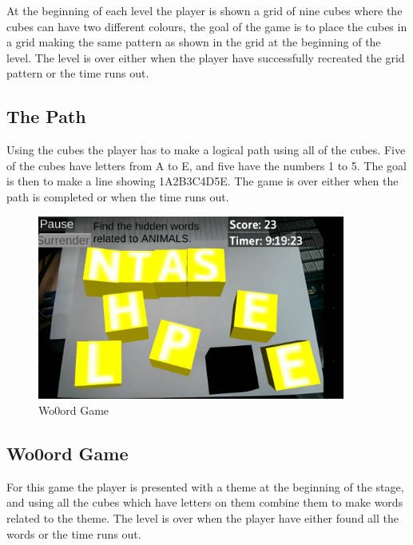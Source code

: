 At the beginning of each level the player is shown a grid of nine cubes where the cubes can have two different colours, the goal of the game is to place the cubes in a grid making the same pattern as shown in the grid at the beginning of the level. The level is over either when the player have successfully recreated the grid pattern or the time runs out.


\subsection{The Path}
	\label{game:the_path}

Using the cubes the player has to make a logical path using all of the cubes. Five of the cubes have letters from A to E, and five have the numbers 1 to 5. The goal is then to make a line showing 1A2B3C4D5E. The game is over either when the path is completed or when the time runs out.


\begin{figure}[h]
	\centering
	\begin{minipage}{.5\textwidth}
		\capstart
		\centering
		\vspace{10pt}
		\includegraphics[width=0.9\textwidth]{images/Wo0ords_screenshot.jpg}
		\vspace{-10pt}
		\caption{Wo0ord Game}
		\label{fig:Costas_wo0ords}
	\end{minipage}%
\end{figure}


\subsection{Wo0ord Game}
	\label{game:wo0ord_game}
	
For this game the player is presented with a theme at the beginning of the stage, and using all the cubes which have letters on them combine them to make words related to the theme. 
The level is over when the player have either found all the words or the time runs out.
